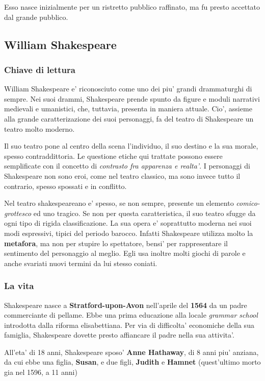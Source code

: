 \documentclass{article}
\begin{document}
{{    Esso nasce inizialmente per un ristretto pubblico raffinato, ma fu presto accettato dal grande pubblico.
  }

  \subsection{William Shakespeare}
  {
    \subsubsection{Chiave di lettura}
    William Shakespeare e' riconosciuto come uno dei piu' grandi drammaturghi di sempre. Nei suoi drammi, Shakespeare prende spunto da figure e moduli narrativi medievali e umanistici, che, tuttavia, presenta in maniera attuale. Cio', assieme alla grande caratterizazione dei suoi personaggi, fa del teatro di Shakespeare un teatro molto moderno.

    Il suo teatro pone al centro della scena l'individuo, il suo destino e la sua morale, spesso contraddittoria. Le questione etiche qui trattate possono essere semplificate con il concetto di \textit{contrasto fra apparenza e realta'}. I personaggi di Shakespeare non sono eroi, come nel teatro classico, ma sono invece tutto il contrario, spesso spossati e in conflitto.

    Nel teatro shakespeareano e' spesso, se non sempre, presente un elemento \textit{comico-grottesco} ed uno tragico. Se non per questa caratteristica, il suo teatro sfugge da ogni tipo di rigida classificazione. La sua opera e' soprattutto moderna nei suoi modi espressivi, tipici del periodo barocco. Infatti Shakespeare utilizza molto la \textbf{metafora}, ma non per stupire lo spettatore, bensi' per rappresentare il sentimento del personaggio al meglio. Egli usa inoltre molti giochi di parole e anche svariati nuovi termini da lui stesso coniati.

    \subsubsection{La vita}
    Shakespeare nasce a \textbf{Stratford-upon-Avon} nell'aprile del \textbf{1564} da un padre commerciante di pellame. Ebbe una prima educazione alla locale \textit{grammar school} introdotta dalla riforma elisabettiana. Per via di difficolta' economiche della sua famiglia, Shakespeare dovette presto affiancare il padre nella sua attivita'.

    All'eta' di 18 anni, Shakespeare sposo' \textbf{Anne Hathaway}, di 8 anni piu' anziana, da cui ebbe una figlia, \textbf{Susan}, e due figli, \textbf{Judith} e \textbf{Hamnet} \small{(quest'ultimo morto gia nel 1596, a 11 anni)}

}}
\end{document}
